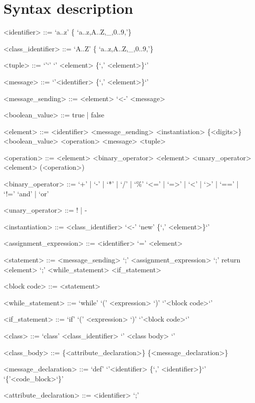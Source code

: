 \documentclass{eplDoc}
\begin{document}
\maketitle
\newpage

\section{Syntax description}

\begin{grammar}
<identifier> ::= `a..z' \{ `a..z,A..Z,\_,0..9,'\} 

<class\_identifier> ::= `A..Z' \{ `a..z,A..Z,\_,0..9,'\} 

<tuple> ::= `{'`}' \alt `{' <element> \{`,' <element>\}`}'

<message> ::= `{'<identifier> \{`,' <element>\}`}'

<message\_sending> ::= <element> `<-' <message>

<boolean\_value> ::= true | false

<element> ::= <identifier> 
\alt<message\_sending>
\alt<instantiation>
\alt \{<digits>\}
\alt <boolean\_value>
\alt <operation>
\alt <message>
\alt <tuple>

<operation> ::= <element> <binary\_operator> <element>
\alt <unary\_operator> <element>
\alt (<operation>)

<binary\_operator> ::= `+' | `-' | `*' | `/' | `\%' 
\alt `<=' | `=>' | `<' | `>' | `==' | `!=' 
\alt `and' | `or'

<unary\_operator> ::= ! | - 

<instantiation> ::= <class\_identifier> `<-' `{new' \{`,' <element>\}`}'


<assignment\_expression> ::= <identifier> `=' <element>

<statement> ::= <message\_sending> `;'
\alt <assignment\_expression> `;'
\alt return <element> `;'
\alt <while\_statement>
\alt <if\_statement>

<block code> ::= { <statement> }

<while\_statement> ::= `while' `(' <expression> `)'  `{'<block code>`}'

<if\_statement> ::= `if' `(' <expression> `)'  `{'<block code>`}'




<class> ::= `class' <class\_identifier> `{' <class body> `}'

<class\_body> ::= \{<attribute\_declaration>\} \{<message\_declaration>\}

<message\_declaration> ::= `def'  `{'<identifier> \{`,' <identifier>\}`}' `\{'<code\_block>`\}'

<attribute\_declaration> ::= <identifier> `;'









\end{grammar}
\end{document}
